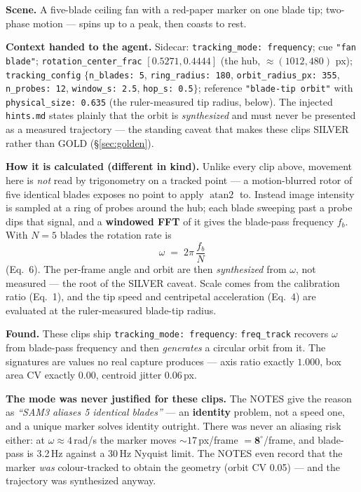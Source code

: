\documentclass[11pt,a4paper]{article}
\begin{document}
\textbf{Scene.} A five-blade ceiling fan with a red-paper marker on one blade tip; two-phase motion
--- spins up to a peak, then coasts to rest.

\textbf{Context handed to the agent.} Sidecar: \texttt{tracking\_mode: frequency}; cue
\texttt{"fan blade"}; \texttt{rotation\_center\_frac} $[0.5271,0.4444]$ (the hub, $\approx(1012,480)$
px); \texttt{tracking\_config} $\{$\texttt{n\_blades: 5}, \texttt{ring\_radius: 180},
\texttt{orbit\_radius\_px: 355}, \texttt{n\_probes: 12}, \texttt{window\_s: 2.5},
\texttt{hop\_s: 0.5}$\}$; reference \texttt{"blade-tip orbit"} with \texttt{physical\_size: 0.635}
(the ruler-measured tip radius, below). The injected \texttt{hints.md} states plainly that the
orbit is \emph{synthesized} and must never be presented as a measured trajectory --- the standing
caveat that makes these clips SILVER rather than GOLD (\S\ref{sec:golden}).

\textbf{How it is calculated (different in kind).} Unlike every clip above, movement here is
\emph{not} read by trigonometry on a tracked point --- a motion-blurred rotor of five identical blades
exposes no point to apply $\operatorname{atan2}$ to. Instead image intensity is sampled at a ring of
probes around the hub; each blade sweeping past a probe dips that signal, and a \textbf{windowed FFT}
of it gives the blade-pass frequency $f_b$. With $N{=}5$ blades the rotation rate is
\[
  \omega \;=\; 2\pi\,\frac{f_b}{N}
\]
(Eq.~6). The per-frame angle and orbit are then \emph{synthesized} from $\omega$, not measured ---
the root of the SILVER caveat. Scale comes from the calibration ratio (Eq.~1), and the tip speed and
centripetal acceleration (Eq.~4) are evaluated at the ruler-measured blade-tip radius.

\textbf{Found.} These clips ship \texttt{tracking\_mode: frequency}: \texttt{freq\_track} recovers
$\omega$ from blade-pass frequency and then \emph{generates} a circular orbit from it. The
signatures are values no real capture produces --- axis ratio exactly $1.000$, box area CV exactly
$0.00$, centroid jitter $0.06$\,px.

\textbf{The mode was never justified for these clips.} The NOTES give the reason as \emph{``SAM3
aliases 5 identical blades''} --- an \textbf{identity} problem, not a speed one, and a unique
marker solves identity outright. There was never an aliasing risk either: at $\omega \approx
4$\,rad/s the marker moves ${\sim}17$\,px/frame $= \mathbf{8^\circ}$/frame, and blade-pass is
3.2\,Hz against a 30\,Hz Nyquist limit. The NOTES even record that the marker \emph{was}
colour-tracked to obtain the geometry (orbit CV 0.05) --- and the trajectory was synthesized anyway.
\end{document}
